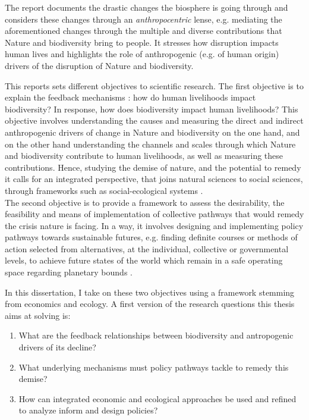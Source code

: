 The \cite{ipbes_2022_6417333} report documents the drastic changes the biosphere is going through and considers these changes through an \textit{anthropocentric} lense, e.g. mediating the aforementioned changes through the multiple and diverse contributions that Nature and biodiversity bring to people. It stresses how disruption impacts human lives and highlights the role of anthropogenic (e.g. of human origin) drivers of the disruption of Nature and biodiversity. 
 
This reports sets different objectives to scientific research. The first objective is to explain the feedback mechanisms : how do human livelihoods impact biodiversity? In response, how does biodiversity impact human livelihoods? This objective involves understanding the causes and measuring the direct and indirect anthropogenic drivers of change in Nature and biodiversity on the one hand, and on the other hand understanding the channels and scales through which Nature and biodiversity contribute to human livelihoods, as well as measuring these contributions. Hence, studying the demise of nature, and the potential to remedy it calls for an integrated perspective, that joins natural sciences to social sciences, through frameworks such as social-ecological systems \citep{Ostrom2009}. 
\\
The second objective is to provide a framework to assess the desirability, the feasibility and means of implementation of collective pathways that would remedy the crisis nature is facing. In a way, it involves designing and implementing policy pathways towards sustainable futures, e.g. finding definite courses or methods of action selected from alternatives, at the individual, collective or governmental levels, to achieve future states of the world which remain in a safe operating space regarding planetary bounds \citep{rockstrom2009safe,steffen_2015_planetary}.

In this dissertation, I take on these two objectives using a framework stemming from economics and ecology. A first version of the research questions this thesis aims at solving is: 
\begin{enumerate}
\setlength{\itemsep}{0pt} %
\item What are the feedback relationships between biodiversity and antropogenic drivers of its decline? 
\item What underlying mechanisms must policy pathways tackle to remedy this demise?
\item  How can integrated economic and ecological approaches be used and refined to analyze inform and design policies? 
\end{enumerate}

